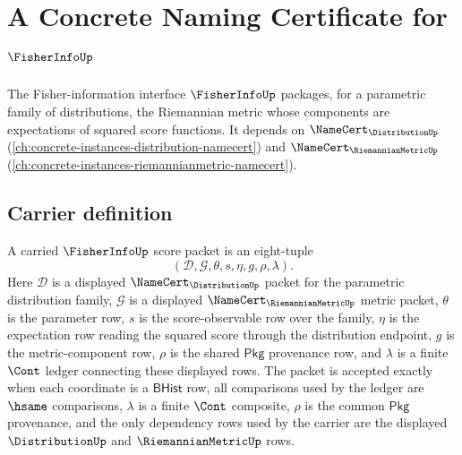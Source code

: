 \chapter{A Concrete Naming Certificate for $\FisherInfoUp$}
\label{ch:concrete-instances-fisherinfo-namecert}

The Fisher-information interface $\FisherInfoUp$ packages, for a parametric family of distributions, the Riemannian metric whose components are expectations of squared score functions. It depends on $\NameCert_{\DistributionUp}$ (\autoref{ch:concrete-instances-distribution-namecert}) and $\NameCert_{\RiemannianMetricUp}$ (\autoref{ch:concrete-instances-riemannianmetric-namecert}).

\section{Carrier definition}
\label{sec:fisherinfo-carrier}

\begin{definition}
\label{def:fisherinfo-bhist-score-carrier}
A carried $\FisherInfoUp$ score packet is an eight-tuple
$$
(\mathcal{D},\mathcal{G},\theta,s,\eta,g,\rho,\lambda).
$$
Here $\mathcal{D}$ is a displayed $\NameCert_{\DistributionUp}$ packet for the
parametric distribution family, $\mathcal{G}$ is a displayed
$\NameCert_{\RiemannianMetricUp}$ metric packet, $\theta$ is the parameter
row, $s$ is the score-observable row over the family, $\eta$ is the
expectation row reading the squared score through the distribution endpoint,
$g$ is the metric-component row, $\rho$ is the shared $\mathsf{Pkg}$
provenance row, and $\lambda$ is a finite $\Cont$ ledger connecting these
displayed rows. The packet is accepted exactly when each coordinate is a
$\mathsf{BHist}$ row, all comparisons used by the ledger are $\hsame$
comparisons, $\lambda$ is a finite $\Cont$ composite, $\rho$ is the common
$\mathsf{Pkg}$ provenance, and the only dependency rows used by the carrier
are the displayed $\DistributionUp$ and $\RiemannianMetricUp$ rows.
\end{definition}

